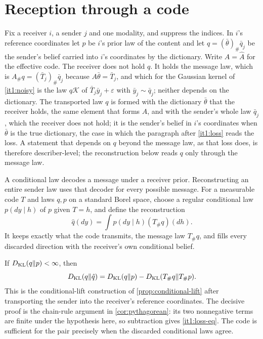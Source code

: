 \section{Reception through a code}
\label{it1:ch-reception}

Fix a receiver $i$, a sender $j$ and one modality, and suppress the indices. In $i$'s reference coordinates let $p$ be $i$'s prior law of the content and let $q=(\bar\theta)_\#\bar q_j$ be the sender's belief carried into $i$'s coordinates by the dictionary. Write $A=\hat A$ for the effective code. The receiver does not hold $q$. It holds the message law, which is $A_\#q=(\bar T_j)_\#\bar q_j$ because $A\bar\theta=\bar T_j$, and which for the Gaussian kernel of \cref{it1:noisy} is the law $q\mathcal K$ of $\bar T_j\bar y_j+\varepsilon$ with $\bar y_j\sim\bar q_j$; neither depends on the dictionary. The transported law $q$ is formed with the dictionary $\bar\theta$ that the receiver holds, the same element that forms $A$, and with the sender's whole law $\bar q_j$, which the receiver does not hold; it is the sender's belief in $i$'s coordinates when $\bar\theta$ is the true dictionary, the case in which the paragraph after \cref{it1:loss} reads the loss. A statement that depends on $q$ beyond the message law, as that loss does, is therefore describer-level; the reconstruction below reads $q$ only through the message law.

A conditional law decodes a message under a receiver prior. Reconstructing an entire sender law uses that decoder for every possible message. For a measurable code $T$ and laws $q,p$ on a standard Borel space, choose a regular conditional law $p(dy\mid h)$ of $p$ given $T=h$, and define the reconstruction
\begin{equation}
\hat q(dy)=\int p(dy\mid h)(T_\#q)(dh).
\label{it1:reconstruction}
\end{equation}
It keeps exactly what the code transmits, the message law $T_\#q$, and fills every discarded direction with the receiver's own conditional belief.

If $D_{\mathrm{KL}}(q\Vert p)<\infty$, then
\begin{equation}
D_{\mathrm{KL}}(q\Vert\hat q)=D_{\mathrm{KL}}(q\Vert p)-D_{\mathrm{KL}}(T_\#q\Vert T_\#p).
\label{it1:loss-eq}
\end{equation}
This is the conditional-lift construction of \cref{prop:conditional-lift} after transporting the sender into the receiver's reference coordinates. The decisive proof is the chain-rule argument in \cref{cor:pythagorean}: its two nonnegative terms are finite under the hypothesis here, so subtraction gives \cref{it1:loss-eq}. The code is sufficient for the pair precisely when the discarded conditional laws agree.

